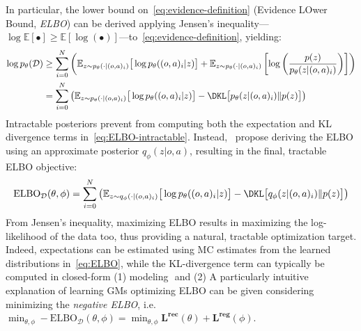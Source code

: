 In particular, the lower bound on~\ref{eq:evidence-definition} (Evidence LOwer Bound, \emph{ELBO}) can be derived applying Jensen's inequality---\(\log \mathbb{E}[\bullet] \geq \mathbb{E} [\log (\bullet)] \)---to~\ref{eq:evidence-definition}, yielding:
\begin{align}
    \log p_\theta(\mathcal D) &\geq \sum_{i=0}^{N} \left(
            \mathbb{E}_{z \sim p_\theta(\cdot \vert (o,a)_i)} \big[ \log p_\theta((o,a)_i \vert z) \big]
            + \mathbb{E}_{z \sim p_\theta(\cdot \vert (o,a)_i)} \left[ \log \left( \frac{p(z)}{p_\theta(z \vert (o,a)_i)} \right) \right]
        \right) \\
        &= \sum_{i=0}^{N} \left(
            \mathbb{E}_{z \sim p_\theta(\cdot \vert (o,a)_i)} \big[ \log p_\theta((o,a)_i \vert z) \big]
        - \DKL \big[ p_\theta(z \vert (o,a)_i) \Vert p(z) \big]
        \right) \label{eq:ELBO-intractable}
\end{align}
Intractable posteriors prevent from computing both the expectation and KL divergence terms in~\ref{eq:ELBO-intractable}.
Instead,~\citet{kingmaAutoEncodingVariationalBayes2022} propose deriving the ELBO using an approximate posterior \( q_\phi(z \vert o,a) \), resulting in the final, tractable ELBO objective:
\begin{align}
\text{ELBO}_{\mathcal D}(\theta, \phi) = \sum_{i=0}^{N} \left(
            \mathbb{E}_{z \sim q_\phi(\cdot \vert (o,a)_i)} \big[ \log p_\theta((o,a)_i \vert z) \big]
        - \DKL \big[ q_\phi(z \vert (o,a)_i) \Vert p(z) \big]
        \right)
        \label{eq:ELBO}
\end{align}
From Jensen's inequality, maximizing ELBO results in maximizing the log-likelihood of the data too, thus providing a natural, tractable optimization target.
Indeed, expectations can be estimated using MC estimates from the learned distributions in~\ref{eq:ELBO}, while the KL-divergence term can typically be computed in closed-form (1) modeling  \( \) and (2) 
A particularly intuitive explanation of learning GMs optimizing ELBO can be given considering minimizing the \emph{negative ELBO}, i.e. \( \min_{\theta, \phi} - \text{ELBO}_{\mathcal D}(\theta, \phi) = \min_{\theta, \phi}\mathbf{L^{\text{rec}}}(\theta) + \mathbf{L^{\text{reg}}}(\phi) \).

